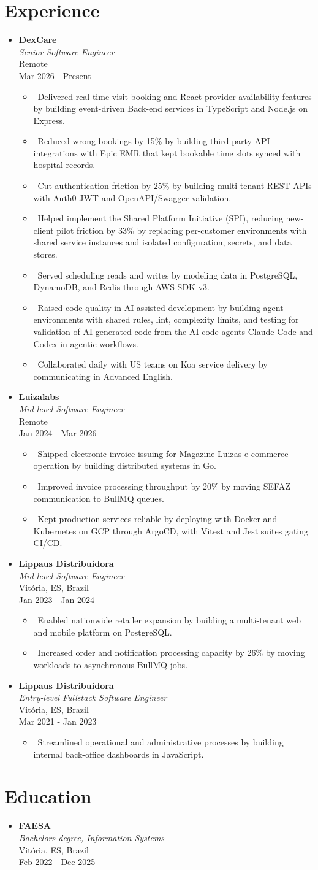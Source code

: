 \documentclass[letterpaper,10pt]{article}
\newcommand{\resumeItem}[1]{\item\small{#1}}
\newcommand{\resumeSubheading}[4]{
\item
  \textbf{#1}\\[-1pt]
  \textit{#3}\\[-1pt]
  \small #4\\[-1pt]
  \small #2\vspace{3pt}
}
\newcommand{\resumeSubHeadingList}{\begin{itemize}[leftmargin=0.15in, label={}, nosep]}
\newcommand{\resumeSubHeadingListEnd}{\end{itemize}}
\newcommand{\resumeRoleGap}{\vspace{8pt}}
\begin{document}
\section{Experience}
\resumeSubHeadingList
  \resumeSubheading
      {DexCare}{Mar 2026 - Present}
      {Senior Software Engineer}{Remote}
      \resumeSubHeadingList
          \resumeItem{\textbullet\ Delivered real-time visit booking and React provider-availability features by building event-driven Back-end services in TypeScript and Node.js on Express.}
          \resumeItem{\textbullet\ Reduced wrong bookings by 15\% by building third-party API integrations with Epic EMR that kept bookable time slots synced with hospital records.}
          \resumeItem{\textbullet\ Cut authentication friction by 25\% by building multi-tenant REST APIs with Auth0 JWT and OpenAPI/Swagger validation.}
          \resumeItem{\textbullet\ Helped implement the Shared Platform Initiative (SPI), reducing new-client pilot friction by 33\% by replacing per-customer environments with shared service instances and isolated configuration, secrets, and data stores.}
          \resumeItem{\textbullet\ Served scheduling reads and writes by modeling data in PostgreSQL, DynamoDB, and Redis through AWS SDK v3.}
          \resumeItem{\textbullet\ Raised code quality in AI-assisted development by building agent environments with shared rules, lint, complexity limits, and testing for validation of AI-generated code from the AI code agents Claude Code and Codex in agentic workflows.}
          \resumeItem{\textbullet\ Collaborated daily with US teams on Koa service delivery by communicating in Advanced English.}
      \resumeSubHeadingListEnd
  \resumeRoleGap
  \resumeSubheading
      {Luizalabs}{Jan 2024 - Mar 2026}
      {Mid-level Software Engineer}{Remote}
      \resumeSubHeadingList
          \resumeItem{\textbullet\ Shipped electronic invoice issuing for Magazine Luiza\textquotesingle{}s e-commerce operation by building distributed systems in Go.}
          \resumeItem{\textbullet\ Improved invoice processing throughput by 20\% by moving SEFAZ communication to BullMQ queues.}
          \resumeItem{\textbullet\ Kept production services reliable by deploying with Docker and Kubernetes on GCP through ArgoCD, with Vitest and Jest suites gating CI/CD.}
      \resumeSubHeadingListEnd
  \resumeRoleGap
  \resumeSubheading
      {Lippaus Distribuidora}{Jan 2023 - Jan 2024}
      {Mid-level Software Engineer}{Vit\'oria, ES, Brazil}
      \resumeSubHeadingList
          \resumeItem{\textbullet\ Enabled nationwide retailer expansion by building a multi-tenant web and mobile platform on PostgreSQL.}
          \resumeItem{\textbullet\ Increased order and notification processing capacity by 26\% by moving workloads to asynchronous BullMQ jobs.}
      \resumeSubHeadingListEnd
  \resumeRoleGap
  \resumeSubheading
      {Lippaus Distribuidora}{Mar 2021 - Jan 2023}
      {Entry-level Fullstack Software Engineer}{Vit\'oria, ES, Brazil}
      \resumeSubHeadingList
          \resumeItem{\textbullet\ Streamlined operational and administrative processes by building internal back-office dashboards in JavaScript.}
      \resumeSubHeadingListEnd
\resumeSubHeadingListEnd

\resumeRoleGap
\section{Education}
\resumeSubHeadingList
  \resumeSubheading
      {FAESA}{Feb 2022 - Dec 2025}
      {Bachelor\textquotesingle{}s degree, Information Systems}{Vit\'oria, ES, Brazil}
\resumeSubHeadingListEnd
\end{document}
